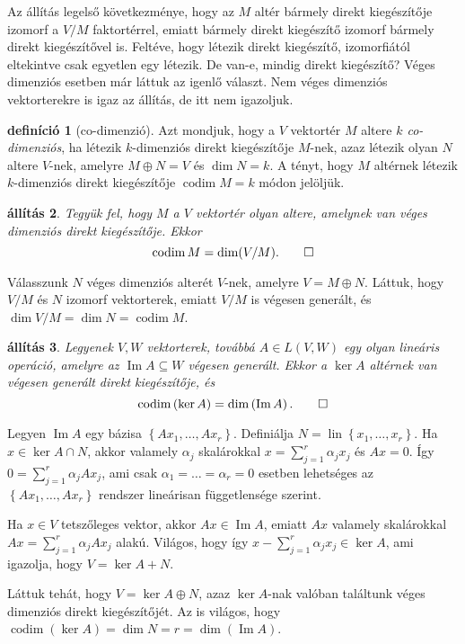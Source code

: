 \documentclass[9pt, showtrims]{memoir}
\makeatletter
\renewenvironment{proof}[1][\proofname]
    {\par\pushQED{\qed}%
    \normalfont \topsep6\p@\@plus6\p@\relax
    \trivlist
    \item[\hskip\labelsep
        \itshape
    #1\@addpunct{:}]\ignorespaces}
    {\popQED\endtrivlist\@endpefalse}
\theoremstyle{plain}
\newtheorem{proposition}{állítás}[section]
\theoremstyle{remark}
\theoremstyle{definition}
\newtheorem{definition}[proposition]{definíció}
\DeclareMathOperator{\lin}{lin}
\DeclareMathOperator{\codim}{codim}
\DeclareMathOperator{\im}{Im}
\makeatother
\begin{document}
Az állítás legelső következménye, 
hogy az $M$ altér bármely direkt kiegészítője izomorf a $V/M$ faktortérrel,
emiatt bármely direkt kiegészítő izomorf bármely direkt kiegészítővel is.
Feltéve, hogy 
létezik direkt kiegészítő, izomorfiától eltekintve csak egyetlen egy létezik.
De van-e, mindig direkt kiegészítő? 
Véges dimenziós esetben már láttuk az igenlő választ.
Nem véges dimenziós vektorterekre is igaz az állítás, de itt nem igazoljuk.
\begin{definition}[co-dimenzió]
    Azt mondjuk, hogy a $V$ vektortér $M$ altere \emph{$k$ co-dimenziós},
    ha létezik $k$-dimenziós direkt kiegészítője $M$-nek,
    azaz létezik olyan $N$ altere $V$-nek, amelyre $M\oplus N=V$
    és $\dim N=k$.
    A tényt,
    hogy $M$ altérnek létezik $k$-dimenziós direkt kiegészítője
    $\codim M=k$ módon jelöljük.
\end{definition}
\begin{proposition}
    Tegyük fel, hogy $M$ a $V$ vektortér olyan altere,
    amelynek van véges dimenziós direkt kiegészítője.
    Ekkor
    \[
        \codim M=\dim(V/M).\qedhere
    \]
\end{proposition}
\begin{proof}
    Válasszunk $N$ véges dimenziós alterét $V$-nek, 
    amelyre $V=M\oplus N$.
    Láttuk, hogy $V/M$ és $N$ izomorf vektorterek,
    emiatt $V/M$ is végesen generált, és
    $\dim V/M=\dim N=\codim M$.
\end{proof}
\begin{proposition}
    Legyenek $V,W$ vektorterek,
    továbbá $A\in L\left( V,W \right)$ egy olyan lineáris operáció,
    amelyre az $\im A\subseteq W$ végesen generált.
    Ekkor a $\ker A$ altérnek van végesen generált direkt kiegészítője, és
    \[
        \codim\left( \ker A \right)=\dim\left( \im A \right).\qedhere
    \]
\end{proposition}
    \begin{proof}
        Legyen $\im A$ egy bázisa $\left\{ Ax_1,\dots,Ax_r \right\}$.
        Definiálja $N=\lin\left\{ x_1,\dots,x_r \right\}$.
        Ha $x\in\ker A\cap N$, akkor valamely $\alpha_j$ skalárokkal
        $x=\sum_{j=1}^r\alpha_jx_j$ és $Ax=0$.
        Így $0=\sum_{j=1}^r\alpha_jAx_j$, ami csak $\alpha_1=\dots=\alpha_r=0$
        esetben lehetséges az $\left\{ Ax_1,\dots,Ax_r \right\}$ rendszer lineárisan függetlensége szerint.

        Ha $x\in V$ tetszőleges vektor, akkor $Ax\in\im A$, emiatt
        $Ax$ valamely skalárokkal $Ax=\sum_{j=1}^r\alpha_jAx_j$ alakú.
        Világos, hogy így $x-\sum_{j=1}^r\alpha_jx_j\in\ker A$,
        ami igazolja, hogy $V=\ker A+N$.

        Láttuk tehát, hogy $V=\ker A\oplus N$, azaz $\ker A$-nak valóban találtunk véges dimenziós direkt kiegészítőjét.
        Az is világos, hogy $\codim\left( \ker A \right)=\dim N=r=\dim\left( \im A \right)$.
    \end{proof}
\end{document}
